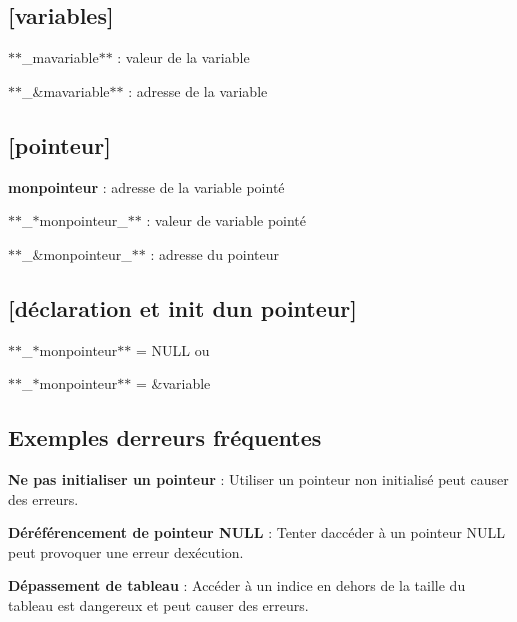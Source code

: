 \subsection*{\mbox{[}variables\mbox{]}}


\begin{DoxyItemize}
\item $\ast$$\ast$\+\_\+mavariable$\ast$$\ast$ \+: valeur de la variable
\item $\ast$$\ast$\+\_\+\&mavariable$\ast$$\ast$ \+: adresse de la variable
\end{DoxyItemize}

\subsection*{\mbox{[}pointeur\mbox{]}}


\begin{DoxyItemize}
\item {\bfseries monpointeur} \+: adresse de la variable pointé
\item $\ast$$\ast$\+\_\+$\ast$monpointeur\+\_\+$\ast$$\ast$ \+: valeur de variable pointé
\item $\ast$$\ast$\+\_\+\&monpointeur\+\_\+$\ast$$\ast$ \+: adresse du pointeur
\end{DoxyItemize}

\subsection*{\mbox{[}déclaration et init d\textquotesingle{}un pointeur\mbox{]}}


\begin{DoxyItemize}
\item $\ast$$\ast$\+\_\+$\ast$monpointeur$\ast$$\ast$ = N\+U\+LL ou
\item $\ast$$\ast$\+\_\+$\ast$monpointeur$\ast$$\ast$ = \&variable
\end{DoxyItemize}

\subsection*{Exemples d\textquotesingle{}erreurs fréquentes}


\begin{DoxyItemize}
\item {\bfseries Ne pas initialiser un pointeur} \+: Utiliser un pointeur non initialisé peut causer des erreurs.
\item {\bfseries Déréférencement de pointeur N\+U\+LL} \+: Tenter d\textquotesingle{}accéder à un pointeur N\+U\+LL peut provoquer une erreur d\textquotesingle{}exécution.
\item {\bfseries Dépassement de tableau} \+: Accéder à un indice en dehors de la taille du tableau est dangereux et peut causer des erreurs.
\end{DoxyItemize}

